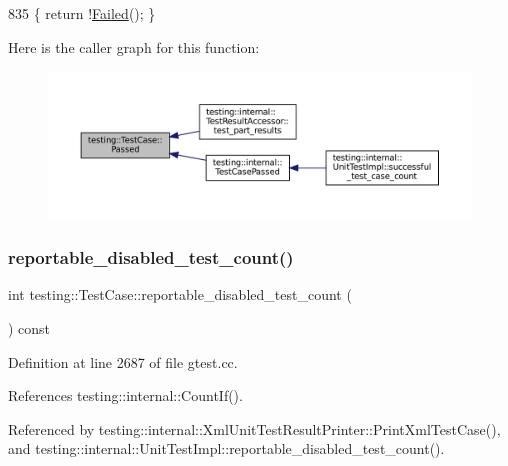 \begin{DoxyCode}
835 \{ \textcolor{keywordflow}{return} !\hyperlink{classtesting_1_1TestCase_ae71c30eab6f1673b82090a0e745c2aa5}{Failed}(); \}
\end{DoxyCode}
Here is the caller graph for this function\+:
\nopagebreak
\begin{figure}[H]
\begin{center}
\leavevmode
\includegraphics[width=350pt]{classtesting_1_1TestCase_a29bbfd227b732a90198b5280c039c271_icgraph}
\end{center}
\end{figure}
\mbox{\label{classtesting_1_1TestCase_ad6b34335955967bc361b2fbacd2dd6c9}} 
\subsubsection{\texorpdfstring{reportable\+\_\+disabled\+\_\+test\+\_\+count()}{reportable\_disabled\_test\_count()}}
{\footnotesize\ttfamily int testing\+::\+Test\+Case\+::reportable\+\_\+disabled\+\_\+test\+\_\+count (\begin{DoxyParamCaption}{ }\end{DoxyParamCaption}) const}



Definition at line 2687 of file gtest.\+cc.



References testing\+::internal\+::\+Count\+If().



Referenced by testing\+::internal\+::\+Xml\+Unit\+Test\+Result\+Printer\+::\+Print\+Xml\+Test\+Case(), and testing\+::internal\+::\+Unit\+Test\+Impl\+::reportable\+\_\+disabled\+\_\+test\+\_\+count().


